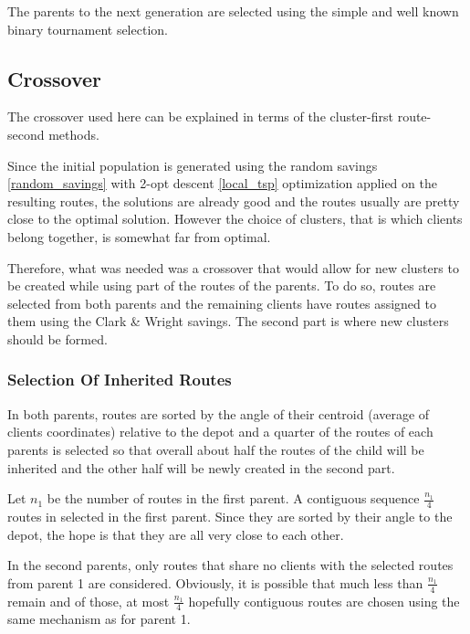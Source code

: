 \documentclass{article} %
\begin{document}
The parents to the next generation are selected using the simple and well known binary tournament selection.


\subsection{Crossover}

The crossover used here can be explained in terms of the cluster-first route-second methods.\newline

Since the initial population is generated using the random savings \ref{random_savings} with 2-opt descent \ref{local_tsp} optimization applied on the resulting routes, the solutions are already good and the routes usually are pretty close to the optimal solution. However the choice of clusters, that is which clients belong together, is somewhat far from optimal.\newline

Therefore, what was needed was a crossover that would allow for new clusters to be created while using part of the routes of the parents. To do so, routes are selected from both parents and the remaining clients have routes assigned to them using the Clark \& Wright savings. The second part is where new clusters should be formed.


\subsubsection{Selection Of Inherited Routes}

In both parents, routes are sorted by the angle of their centroid (average of clients coordinates) relative to the depot and a quarter of the routes of each parents is selected so that overall about half the routes of the child will be inherited and the other half will be newly created in the second part.\newline

Let $n_1$ be the number of routes in the first parent. A contiguous sequence $\frac{n_1}{4}$ routes in selected in the first parent. Since they are sorted by their angle to the depot, the hope is that they are all very close to each other.\newline

In the second parents, only routes that share no clients with the selected routes from parent 1 are considered.  Obviously, it is possible that much less than $\frac{n_1}{4}$ remain and of those, at most $\frac{n_1}{4}$ hopefully contiguous routes are chosen using the same mechanism as for parent 1.\newline
\end{document}
